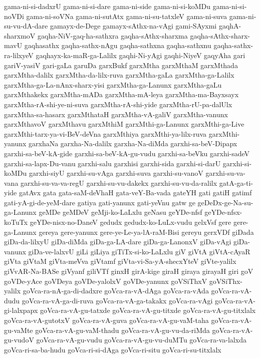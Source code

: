 {gama-ni-si-dadxrU
gama-ni-si-dare
gama-ni-side
gama-ni-si-koMDu
gama-ni-si-noVDi
gama-ni-soVNa
gama-ni-sutAtx
gama-ni-su-tatxleV
gama-ni-suva
gama-ni-su-vu-dA-dare
gamayx-de-Dege
gamayx-sAthx-na-vAgi
gami-SAyxmi
gaqhA-sharxmoV
gaqha-NiV-gaq-ha-sathxra
gaqha-sAthx-sharxma
gaqha-sAthx-sharx-mavU
gaqhasathx
gaqha-sathx-nAgu
gaqha-sathxna
gaqha-sathxnu
gaqha-sathx-ra-lilxyeV
gaqhayx-ka-maR-ga-Lalilx
gaqhi-Ni-yAgi
gaqhi-NiyeV
gaqyAha
gari
gariV-yasiV
gari-gaLa
garuDa
garxBukf
garxMtha
garxMthaM
garxMthada
garxMtha-dalilx
garxMtha-da-lilx-ruva
garxMtha-gaLa
garxMtha-ga-Lalilx
garxMtha-ga-La-nAnx-sharx-yisi
garxMtha-ga-Lanunx
garxMtha-gaLu
garxMthakekx
garxMtha-mADa
garxMtha-mA-leya
garxMtha-ma-Bayxsayx
garxMtha-rA-shi-ye-ni-suva
garxMtha-rA-shi-yide
garxMtha-rU-pa-dalUlx
garxMtha-sa-hasarx
garxMthataH
garxMtha-vA-galiV
garxMtha-vanunx
garxMthavoV
garxMthavu
garxMthiM
garxMthi-ga-Lanunx
garxMthi-ga-Live
garxMthi-tarx-ya-vi-BeV-deVna
garxMthiya
garxMthi-ya-lilx-ruva
garxMthi-yanunx
garxhaNa
garxha-Na-dalilx
garxha-Na-diMda
garxhi-sa-beV-Dipapx
garxhi-sa-beV-kA-gide
garxhi-sa-beV-kA-gu-vudu
garxhi-sa-beVku
garxhi-sadeV
garxhi-sa-lapx-Du-vanu
garxhi-salu
garxhisi
garxhi-sida
garxhi-si-darU
garxhi-si-koMDu
garxhi-siyU
garxhi-su-vAga
garxhi-suva
garxhi-su-vanoV
garxhi-su-va-vana
garxhi-su-va-va-regU
garxhi-su-vu-dakekx
garxhi-su-vu-da-ralilx
gatA-ga-ti-yide
gatAvx
gata
gata-saM-deVhaH
gata-veY-Ba-vada
gateYH
gati
gatiH
gatimf
gati-yA-gi-de-yeM-dare
gatiya
gati-yanunx
gati-yeVnu
gatw
ge
geDeDx-ge-Na-su-ga-Lanunx
geMDe
geMDeV
geMji-ko-LaLxlu
geNasu
geYDe-nfsf
geYDe-nfsx-koTuTx
geYDe-nisx-no-DaneV
gedudx
gedudx-ko-LuLx-vudu
gelxVsf
gere
gere-ga-Lanunx
gereya
gere-yanunx
gere-ye-Le-ya-lA-raM-Bisi
gereyu
gerxVDf
giDada
giDa-da-lilxyU
giDa-diMda
giDa-ga-LA-dare
giDa-ga-LanonxV
giDa-vAgi
giDa-vanunx
giDa-ve-lalxvU
giLi
giLiya
giTiTx-si-ko-LaLxlu
giV
giVtA
giVtA-cAyaR
giVta
giVtaM
giVta-meVva
giVtamf
giVta-vi-Sa-yA-shecxYteV
giVte-yalilx
giVvAR-Na-BASe
giVyanf
giliVTf
ginxH
girA-kige
giraH
giraya
girayaH
giri
goV
goVDe-yAce
goVDeya
goVDe-yalolxV
goVDe-yanunx
goVSiThxV
goVSiThx-yalilx
goVca-ra-nA-ga-di-dadxre
goVca-ra-vA-dAga
goVca-ra-vAda
goVca-ra-vA-dudu
goVca-ra-vA-ga-di-ruva
goVca-ra-vA-ga-takakx
goVca-ra-vAgi
goVca-ra-vA-gi-lalxpapx
goVca-ra-vA-gu-tatxde
goVca-ra-vA-gu-titxde
goVca-ra-vA-gu-titxlalx
goVca-ra-vA-gutotxV
goVca-ra-vA-guva
goVca-ra-vA-gu-vaM-taha
goVca-ra-vA-gu-vaMte
goVca-ra-vA-gu-vaM-thadu
goVca-ra-vA-gu-vu-da-riMda
goVca-ra-vA-gu-vudoV
goVca-ra-vA-gu-vudu
goVca-ra-vA-gu-vu-duMTu
goVca-ra-va-lalxda
goVca-ri-sa-ba-hudu
goVca-ri-si-dAga
goVca-ri-situ
goVca-ri-su-titxlalx
}
